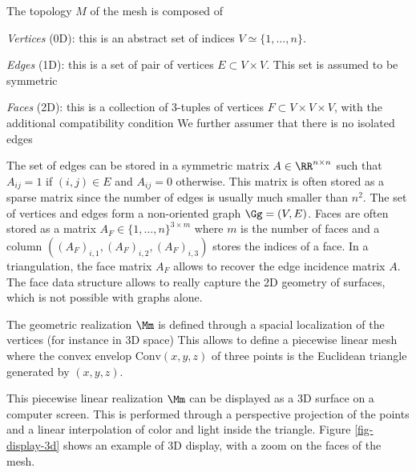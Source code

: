 The topology $M$ of the mesh is composed of
\begin{rs}
	\item \textit{Vertices} (0D): this is an abstract set of indices $V \simeq \{1,\ldots,n\}$.
	\item \textit{Edges} (1D): this is a set of pair of vertices $E \subset V \times V$. This set is assumed to be symmetric
	\item  \textit{Faces} (2D): this is a collection of 3-tuples of vertices $F \subset V \times V \times V$, with the additional 
		compatibility condition
		We further assumer that there is no isolated edges
\end{rs}

The set of edges can be stored in a symmetric matrix $A \in \RR^{n \times n}$ such that $A_{ij}=1$ if $(i,j) \in E$ and $A_{ij}=0$ otherwise. This matrix is often stored as a sparse matrix since the number of edges is usually much smaller than $n^2$. The set of vertices and edges form a non-oriented graph $\Gg=(V,E)$. Faces are often stored as a matrix $A_F \in \{1,\ldots,n\}^{3 \times m}$ where $m$ is the number of faces and a column $((A_F)_{i,1},(A_F)_{i,2},(A_F)_{i,3})$ stores the indices of a face. In a triangulation, the face matrix $A_F$ allows to recover the edge incidence matrix $A$. The face data structure allows to really capture the 2D geometry of surfaces, which is not possible with graphs alone. 

The geometric realization $\Mm$ is defined through a spacial localization of the vertices (for instance in 3D space) 
This allows to define a piecewise linear mesh
where the convex envelop $\text{Conv}(x,y,z)$ of three points is the Euclidean triangle generated by $(x,y,z)$. 

This piecewise linear realization $\Mm$ can be displayed as a 3D surface on a computer screen. This is performed through a perspective projection of the points and a linear interpolation of color and light inside the triangle. Figure \ref{fig-display-3d} shows an example of 3D display, with a zoom on the faces of the mesh.
  

